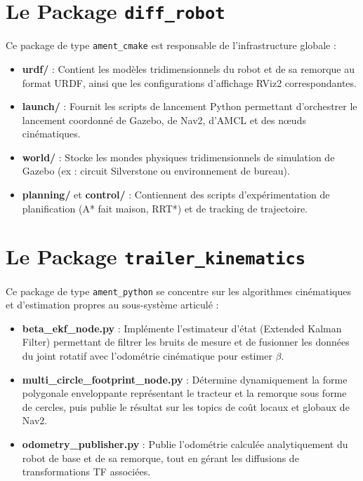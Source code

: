 \documentclass[12pt,a4paper,openany]{report}
\begin{document}
\section{Le Package \texttt{diff\_robot}}
Ce package de type \texttt{ament\_cmake} est responsable de l'infrastructure globale :
\begin{itemize}
    \item \textbf{urdf/} : Contient les modèles tridimensionnels du robot et de sa remorque au format URDF, ainsi que les configurations d'affichage RViz2 correspondantes.
    \item \textbf{launch/} : Fournit les scripts de lancement Python permettant d'orchestrer le lancement coordonné de Gazebo, de Nav2, d'AMCL et des nœuds cinématiques.
    \item \textbf{world/} : Stocke les mondes physiques tridimensionnels de simulation de Gazebo (ex : circuit Silverstone ou environnement de bureau).
    \item \textbf{planning/} et \textbf{control/} : Contiennent des scripts d'expérimentation de planification (A* fait maison, RRT*) et de tracking de trajectoire.
\end{itemize}

\section{Le Package \texttt{trailer\_kinematics}}
Ce package de type \texttt{ament\_python} se concentre sur les algorithmes cinématiques et d'estimation propres au sous-système articulé :
\begin{itemize}
    \item \textbf{beta\_ekf\_node.py} : Implémente l'estimateur d'état (Extended Kalman Filter) permettant de filtrer les bruits de mesure et de fusionner les données du joint rotatif avec l'odométrie cinématique pour estimer $\beta$.
    \item \textbf{multi\_circle\_footprint\_node.py} : Détermine dynamiquement la forme polygonale enveloppante représentant le tracteur et la remorque sous forme de cercles, puis publie le résultat sur les topics de coût locaux et globaux de Nav2.
    \item \textbf{odometry\_publisher.py} : Publie l'odométrie calculée analytiquement du robot de base et de sa remorque, tout en gérant les diffusions de transformations TF associées.
\end{itemize}
\end{document}
